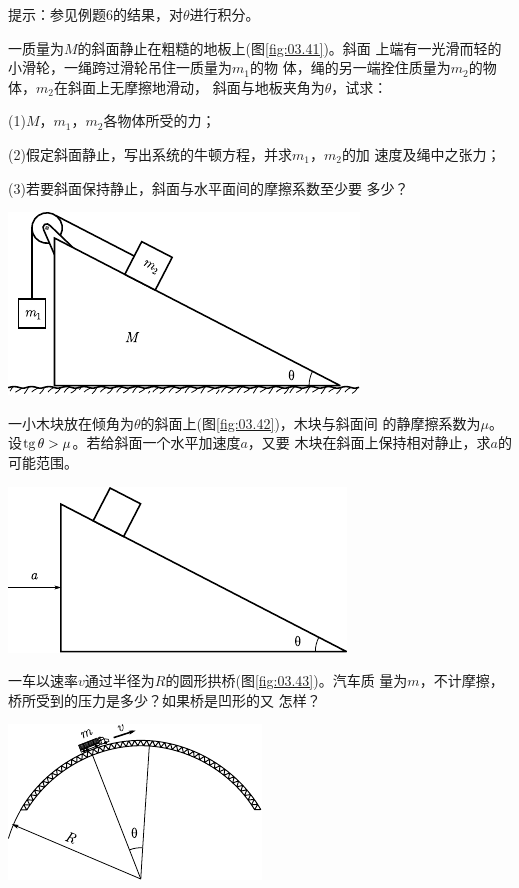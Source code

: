 \begin{exercises}
\lhbrak 提示：参见例题6的结果，对$ \theta $进行积分。\rhbrak

\exercise 一质量为$ M $的斜面静止在粗糙的地板上(图\ref{fig:03.41})。斜面
上端有一光滑而轻的小滑轮，一绳跨过滑轮吊住一质量为$ m_1 $的物
体，绳的另一端拴住质量为$ m_2 $的物体，$ m _ { 2 } $在斜面上无摩擦地滑动，
斜面与地板夹角为$ \theta $，试求：

(1)\;$ M $，$ m _ { 1 } $，$  m _ { 2 }  $各物体所受的力；

(2)假定斜面静止，写出系统的牛顿方程，并求$ m_1 $，$ m_2 $的加
速度及绳中之张力；

(3)若要斜面保持静止，斜面与水平面间的摩擦系数至少要
多少？
\begin{figurex}
	\centering
	\includegraphics{figure/fig03.41}
	\caption{}
	\label{fig:03.41}
\end{figurex}

\exercise 一小木块放在倾角为$ \theta $的斜面上(图\ref{fig:03.42})，木块与斜面间
的静摩擦系数为$ \mu $。设$  \operatorname{tg} \theta > \mu $。若给斜面一个水平加速度$ a $，又要
木块在斜面上保持相对静止，求$ a $的可能范围。
\begin{figurex}
	\centering
	\includegraphics{figure/fig03.42}
	\caption{}
	\label{fig:03.42}
\end{figurex}

\exercise 一车以速率$ v $通过半径为$ R $的圆形拱桥(图\ref{fig:03.43})。汽车质
量为$ m $，不计摩擦，桥所受到的压力是多少？如果桥是凹形的又
怎样？
\begin{figurex}
	\centering
	\includegraphics{figure/fig03.43}
	\caption{}
	\label{fig:03.43}
\end{figurex}
\end{exercises}